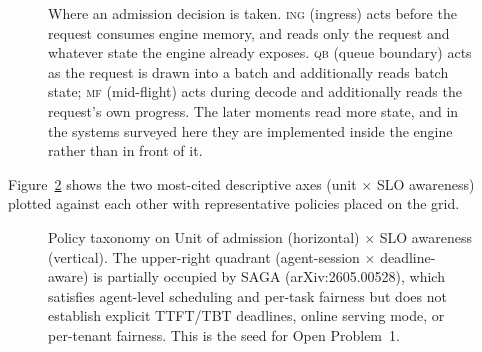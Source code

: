 \documentclass[10pt]{article} %
\theoremstyle{definition}
\begin{document}
\begin{figure}[htbp]
{\begin{tikzpicture}
\end{tikzpicture}%
}
\caption{Where an admission decision is taken. \textsc{ing} (ingress) acts before the request consumes engine memory, and reads only the request and whatever state the engine already exposes. \textsc{qb} (queue boundary) acts as the request is drawn into a batch and additionally reads batch state; \textsc{mf} (mid-flight) acts during decode and additionally reads the request's own progress. The later moments read more state, and in the systems surveyed here they are implemented inside the engine rather than in front of it.}
\label{fig:moments}
\end{figure}

Figure~\ref{fig:taxonomy} shows the two most-cited descriptive axes
(unit $\times$ SLO awareness) plotted against each other with
representative policies placed on the grid.

\begin{figure}[htbp]
\centering
{}
\caption{Policy taxonomy on Unit of admission (horizontal) $\times$
SLO awareness (vertical). The upper-right quadrant (agent-session
$\times$ deadline-aware) is partially occupied by SAGA
(arXiv:2605.00528), which satisfies agent-level scheduling and
per-task fairness but does not establish explicit TTFT/TBT
deadlines, online serving mode, or per-tenant fairness. This is the
seed for Open Problem~1.}
\label{fig:taxonomy}
\end{figure}
\end{document}

